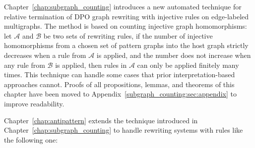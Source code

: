 Chapter~\ref{chap:subgraph_counting} introduces a new automated technique for relative termination of DPO graph rewriting with injective rules on edge-labeled multigraphs.
The method is based on counting injective graph homomorphisms: let $\mathcal{A}$ and $\mathcal{B}$ be two sets of rewriting rules, if the number of injective homomorphisms from a chosen set of pattern graphs into the host graph strictly decreases when a rule from $\mathcal{A}$ is applied, and the number does not increase when any rule from $\mathcal{B}$ is applied, then rules in $\mathcal{A}$ can only be applied finitely many times. This technique can handle some cases that prior interpretation-based approaches cannot.
Proofs of all propositions, lemmas, and theorems of this chapter
 have been moved to Appendix~\ref{subgraph_counting:sec:appendix} to improve readability.

Chapter~\ref{chap:antipattern} extends the technique introduced in Chapter~\ref{chap:subgraph_counting} to handle rewriting systems with rules like the following one:

